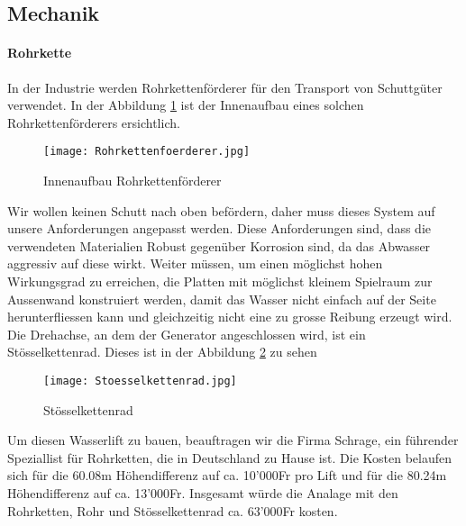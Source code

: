 \newpage


\subsection{Mechanik}

\paragraph{Rohrkette}

In der Industrie werden Rohrkettenförderer für den Transport von Schuttgüter verwendet. In der Abbildung \ref{fig:Rohrkettenfoerderer}  ist der Innenaufbau eines solchen Rohrkettenförderers ersichtlich.

\begin{figure} [H]
	\centering
	\texttt{[image: Rohrkettenfoerderer.jpg]}
	\caption{Innenaufbau Rohrkettenförderer \cite{abconvey}}
	\label{fig:Rohrkettenfoerderer}
\end{figure}

Wir wollen keinen Schutt nach oben befördern, daher muss dieses System auf unsere Anforderungen angepasst werden. Diese Anforderungen sind, dass die verwendeten Materialien Robust gegenüber Korrosion sind, da das Abwasser aggressiv auf diese wirkt. Weiter müssen, um einen möglichst hohen Wirkungsgrad zu erreichen, die Platten mit möglichst kleinem Spielraum zur Aussenwand konstruiert werden, damit das Wasser nicht einfach auf der Seite herunterfliessen kann und gleichzeitig nicht eine zu grosse Reibung erzeugt wird. Die Drehachse, an dem der Generator angeschlossen wird, ist ein Stösselkettenrad. Dieses ist in der Abbildung \ref{fig:stoesselkettenrad}  zu sehen

\begin{figure} [H]
	\centering
	\texttt{[image: Stoesselkettenrad.jpg]}
	\caption{Stösselkettenrad \cite{schrage}}
	\label{fig:stoesselkettenrad}
\end{figure}


Um diesen Wasserlift zu bauen, beauftragen wir die Firma Schrage, ein führender Speziallist für Rohrketten, die in Deutschland zu Hause ist. Die Kosten belaufen sich für die 60.08\si{m} Höhendifferenz auf ca. 10'000\si{Fr} pro Lift und für die 80.24\si{m} Höhendifferenz auf ca. 13'000\si{Fr}. Insgesamt würde die Analage mit den Rohrketten, Rohr und Stösselkettenrad ca. 63'000\si{Fr} kosten. \cite{schrage}

\newpage

